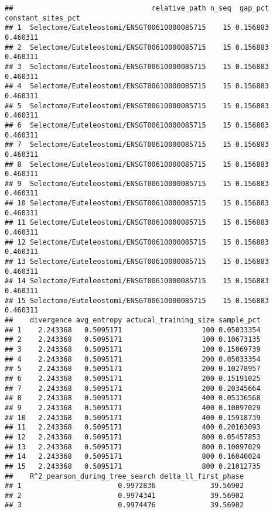 \documentclass[
]{article}
\begin{document}
\begin{verbatim}
##                                 relative_path n_seq  gap_pct constant_sites_pct
## 1  Selectome/Euteleostomi/ENSGT00610000085715    15 0.156883           0.460311
## 2  Selectome/Euteleostomi/ENSGT00610000085715    15 0.156883           0.460311
## 3  Selectome/Euteleostomi/ENSGT00610000085715    15 0.156883           0.460311
## 4  Selectome/Euteleostomi/ENSGT00610000085715    15 0.156883           0.460311
## 5  Selectome/Euteleostomi/ENSGT00610000085715    15 0.156883           0.460311
## 6  Selectome/Euteleostomi/ENSGT00610000085715    15 0.156883           0.460311
## 7  Selectome/Euteleostomi/ENSGT00610000085715    15 0.156883           0.460311
## 8  Selectome/Euteleostomi/ENSGT00610000085715    15 0.156883           0.460311
## 9  Selectome/Euteleostomi/ENSGT00610000085715    15 0.156883           0.460311
## 10 Selectome/Euteleostomi/ENSGT00610000085715    15 0.156883           0.460311
## 11 Selectome/Euteleostomi/ENSGT00610000085715    15 0.156883           0.460311
## 12 Selectome/Euteleostomi/ENSGT00610000085715    15 0.156883           0.460311
## 13 Selectome/Euteleostomi/ENSGT00610000085715    15 0.156883           0.460311
## 14 Selectome/Euteleostomi/ENSGT00610000085715    15 0.156883           0.460311
## 15 Selectome/Euteleostomi/ENSGT00610000085715    15 0.156883           0.460311
##    divergence avg_entropy actucal_training_size sample_pct
## 1    2.243368   0.5095171                   100 0.05033354
## 2    2.243368   0.5095171                   100 0.10673135
## 3    2.243368   0.5095171                   100 0.15069739
## 4    2.243368   0.5095171                   200 0.05033354
## 5    2.243368   0.5095171                   200 0.10278957
## 6    2.243368   0.5095171                   200 0.15191025
## 7    2.243368   0.5095171                   200 0.20345664
## 8    2.243368   0.5095171                   400 0.05336568
## 9    2.243368   0.5095171                   400 0.10097029
## 10   2.243368   0.5095171                   400 0.15918739
## 11   2.243368   0.5095171                   400 0.20103093
## 12   2.243368   0.5095171                   800 0.05457853
## 13   2.243368   0.5095171                   800 0.10097029
## 14   2.243368   0.5095171                   800 0.16040024
## 15   2.243368   0.5095171                   800 0.21012735
##    R^2_pearson_during_tree_search delta_ll_first_phase
## 1                       0.9972836             39.56902
## 2                       0.9974341             39.56902
## 3                       0.9974476             39.56902

\end{verbatim}
\end{document}
